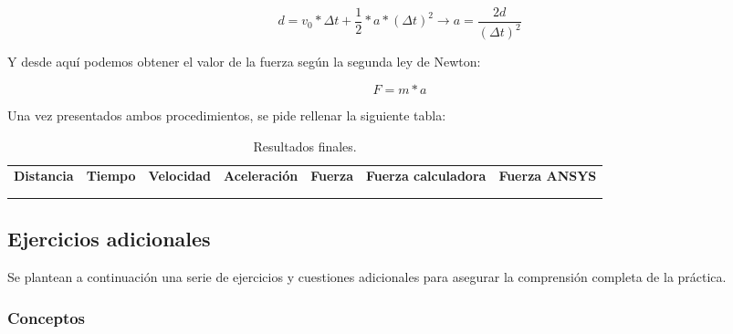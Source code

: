 \[d = v_0 * \Delta t + \frac{1}{2}*a*(\Delta t)^2 \rightarrow a = \frac{2d}{(\Delta t)^2}\]

Y desde aquí podemos obtener el valor de la fuerza según la segunda ley de Newton:

\[F=m*a\]

Una vez presentados ambos procedimientos, se pide rellenar la siguiente tabla:

\begin{table}[H]
    \centering
    \begin{adjustbox}{max width=\textwidth,center}
        \begin{tabular}{|c|c|c|c|c|c|c|}
        \hline
        \textbf{Distancia} & \textbf{Tiempo} & \textbf{Velocidad} & \textbf{Aceleración} & \textbf{Fuerza} & \textbf{Fuerza calculadora} & \textbf{Fuerza ANSYS} \\
          &  &  &  &  &  &  \\
          &  &  &  &  &  &  \\
        \hline
        \end{tabular}
    \end{adjustbox}
    \caption{Resultados finales.}
    \label{tab:resultadosFinales}
\end{table}


\subsection*{Ejercicios adicionales}

Se plantean a continuación una serie de ejercicios y cuestiones adicionales para asegurar la comprensión completa de la práctica.

\subsubsection*{Conceptos}

